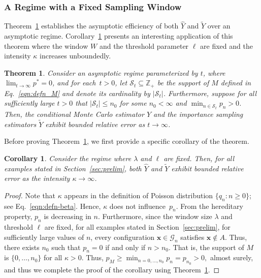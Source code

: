\documentclass[pdflatex, sn-mathphys-ay]{sn-jnl}%
\newcommand{\intg}{\mathbb{Z}}
\newcommand{\mc}{\mathcal}
\renewcommand{\v}[1]{\boldsymbol{#1}}
\newcommand{\mx}{\v{x}}
\newcommand{\scG}{\mathscr{G}}
\newcommand{\wt}{\widetilde}
\newcommand{\wh}{\widehat}
\newtheorem{corollary}{Corollary}
\theoremstyle{thmstyleone}%
\newtheorem{theorem}{Theorem}%
\theoremstyle{thmstyletwo}%
\theoremstyle{thmstylethree}%
\begin{document}
\subsubsection{A Regime with a Fixed Sampling Window}
Theorem~\ref{thm:asym_Yhat} establishes the asymptotic efficiency of both $\wh Y$ and $\wt Y$ over an asymptotic regime.  Corollary~\ref{corr:case1} presents an interesting application of this theorem where the window $W$ and the threshold parameter $\ell$ are fixed and the intensity $\kappa$ increases unboundedly.
\begin{theorem}
\label{thm:asym_Yhat}
Consider an asymptotic regime parameterized by $t$, where $\lim_{t \to \infty} p^*  = 0$, and for  each~$t>0$, let $\mc{S}_t \subseteq \intg_+$ be the support of $M$ defined in Eq.~\eqref{eqn:defn_M} and denote its cardinality by $|\mc{S}_t|$.  Furthermore, suppose for all sufficiently large $t>0$ that $|\mc{S}_t| \leq n_0$ for some $n_0 < \infty$ and $\min_{n \in \mc{S}_t} p_n > 0$. Then, the conditional Monte Carlo estimator $\wh Y$ and the importance sampling estimators $\wt Y$ exhibit bounded relative error as $t \to \infty$.
\end{theorem}



Before proving Theorem~\ref{thm:asym_Yhat}, we first provide a specific corollary of the theorem.


\begin{corollary}
\label{corr:case1}
Consider the regime where $\lambda$ and $\ell$ are fixed. Then, for all examples stated  in Section~\ref{sec:prelim}, both $\wh Y$ and $\wt Y$ exhibit bounded relative error as the intensity $\kappa \to \infty$.
\end{corollary}

\begin{proof}
Note that $\kappa$ appears in the definition of Poisson distribution $\{q_n: n \geq 0\}$; see Eq.~\eqref{eqn:defn-beta}. Hence, $\kappa$ does not influence~$p_n$. 
From the hereditary property, $p_n$ is decreasing in $n$. Furthermore, since the window size $\lambda$ and threshold $\ell$ are fixed, for all  examples stated in Section~\ref{sec:prelim}, for sufficiently large values of $n$, every configuration $\mx \in \scG_n$ satisfies $\mx \notin A$. Thus, there exists $n_0$ such that $p_n = 0$ if and only if $n > n_0$. That is, the support of $M$ is $\{0, \dots, n_0\}$ for all $\kappa > 0$. Thus,  
\(
{  p_M \geq \min_{n = 0, \dots, n_0} p_n = p_{n_0} > 0},
\)
almost surely,
and thus we complete the proof of the corollary using Theorem~\ref{thm:asym_Yhat}.
\end{proof}
\end{document}
